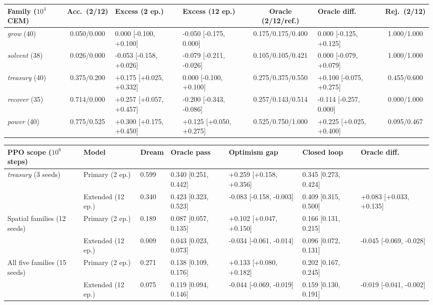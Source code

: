 \vspace{4pt}
\begin{tabular*}{\textwidth}{@{\extracolsep{\fill}}lcllclc@{}}
\toprule
Family ($10^{4}$ CEM) & Acc.\ (2/12) & Excess (2 ep.) & Excess (12 ep.) & Oracle (2/12/ref.) & Oracle diff. & Rej.\ (2/12) \\
\midrule
\emph{grow} (40) & 0.050/0.000 & 0.000 {\tiny[\mbox{-}0.100, +0.100]} & \mbox{-}0.050 {\tiny[\mbox{-}0.175, 0.000]} & 0.175/0.175/0.400 & 0.000 {\tiny[\mbox{-}0.125, +0.125]} & 1.000/1.000 \\
\emph{solvent} (38) & 0.026/0.000 & \mbox{-}0.053 {\tiny[\mbox{-}0.158, +0.026]} & \mbox{-}0.079 {\tiny[\mbox{-}0.211, \mbox{-}0.026]} & 0.105/0.105/0.421 & 0.000 {\tiny[\mbox{-}0.079, +0.079]} & 1.000/1.000 \\
\emph{treasury} (40) & 0.375/0.200 & +0.175 {\tiny[+0.025, +0.332]} & 0.000 {\tiny[\mbox{-}0.100, +0.100]} & 0.275/0.375/0.550 & +0.100 {\tiny[\mbox{-}0.075, +0.275]} & 0.455/0.600 \\
\emph{recover} (35) & 0.714/0.000 & +0.257 {\tiny[+0.057, +0.457]} & \mbox{-}0.200 {\tiny[\mbox{-}0.343, \mbox{-}0.086]} & 0.257/0.143/0.514 & \mbox{-}0.114 {\tiny[\mbox{-}0.257, 0.000]} & 0.000/1.000 \\
\emph{power} (40) & 0.775/0.525 & +0.300 {\tiny[+0.175, +0.450]} & +0.125 {\tiny[+0.050, +0.275]} & 0.525/0.750/1.000 & +0.225 {\tiny[+0.025, +0.400]} & 0.095/0.467 \\
\bottomrule
\end{tabular*}

\vspace{4pt}
\begin{tabular*}{\textwidth}{@{\extracolsep{\fill}}lllllll@{}}
\toprule
PPO scope ($10^{6}$ steps) & Model & Dream & Oracle pass & Optimism gap & Closed loop & Oracle diff. \\
\midrule
\emph{treasury} (3 seeds) & Primary (2 ep.) & 0.599 & 0.340 {\tiny[0.251, 0.442]} & +0.259 {\tiny[+0.158, +0.356]} & 0.345 {\tiny[0.273, 0.424]} &  \\
 & Extended (12 ep.) & 0.340 & 0.423 {\tiny[0.323, 0.523]} & \mbox{-}0.083 {\tiny[\mbox{-}0.158, \mbox{-}0.003]} & 0.409 {\tiny[0.315, 0.500]} & +0.083 {\tiny[+0.033, +0.135]} \\
\midrule
Spatial families (12 seeds) & Primary (2 ep.) & 0.189 & 0.087 {\tiny[0.057, 0.135]} & +0.102 {\tiny[+0.047, +0.150]} & 0.166 {\tiny[0.131, 0.215]} &  \\
 & Extended (12 ep.) & 0.009 & 0.043 {\tiny[0.023, 0.073]} & \mbox{-}0.034 {\tiny[\mbox{-}0.061, \mbox{-}0.014]} & 0.096 {\tiny[0.072, 0.131]} & \mbox{-}0.045 {\tiny[\mbox{-}0.069, \mbox{-}0.028]} \\
\midrule
All five families (15 seeds) & Primary (2 ep.) & 0.271 & 0.138 {\tiny[0.109, 0.176]} & +0.133 {\tiny[+0.080, +0.182]} & 0.202 {\tiny[0.167, 0.245]} &  \\
 & Extended (12 ep.) & 0.075 & 0.119 {\tiny[0.094, 0.146]} & \mbox{-}0.044 {\tiny[\mbox{-}0.069, \mbox{-}0.019]} & 0.159 {\tiny[0.130, 0.191]} & \mbox{-}0.019 {\tiny[\mbox{-}0.041, \mbox{-}0.002]} \\
\bottomrule
\end{tabular*}
